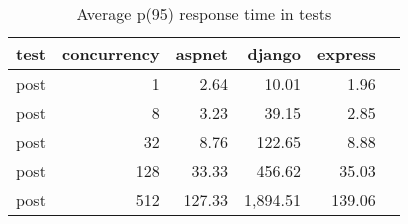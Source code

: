 \FloatBarrier
\begin{table}[!htp]\centering
    \caption{Average p(95) response time in tests}\label{tab:resultsPost}
    \scriptsize
    \begin{tabular}{lrrrrr}\toprule
        test & concurrency & aspnet & django   & express \\\midrule
        post & 1           & 2.64   & 10.01    & 1.96    \\
        post & 8           & 3.23   & 39.15    & 2.85    \\
        post & 32          & 8.76   & 122.65   & 8.88    \\
        post & 128         & 33.33  & 456.62   & 35.03   \\
        post & 512         & 127.33 & 1,894.51 & 139.06  \\
        \bottomrule
    \end{tabular}
\end{table}
\FloatBarrier
